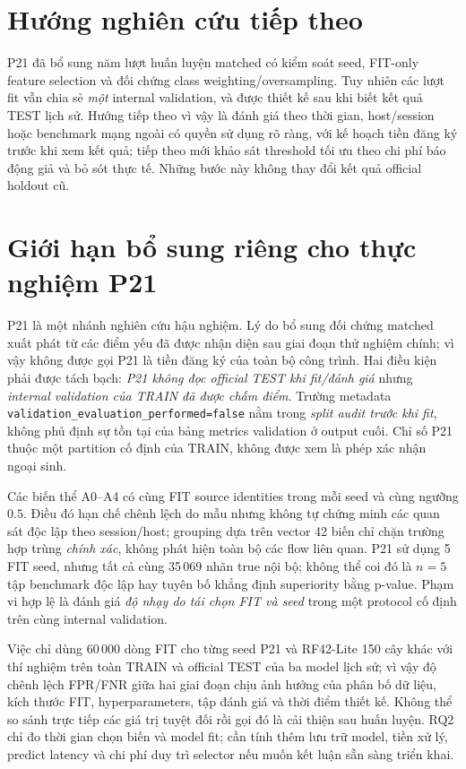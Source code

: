 \section{Hướng nghiên cứu tiếp theo}

P21 đã bổ sung năm lượt huấn luyện matched có kiểm soát seed, FIT-only feature selection và đối chứng class weighting/oversampling. Tuy nhiên các lượt fit vẫn chia sẻ \emph{một} internal validation, và được thiết kế sau khi biết kết quả TEST lịch sử. Hướng tiếp theo vì vậy là đánh giá theo thời gian, host/session hoặc benchmark mạng ngoài có quyền sử dụng rõ ràng, với kế hoạch tiền đăng ký trước khi xem kết quả; tiếp theo mới khảo sát threshold tối ưu theo chi phí báo động giả và bỏ sót thực tế. Những bước này không thay đổi kết quả official holdout cũ.


\section{Giới hạn bổ sung riêng cho thực nghiệm P21}
\label{sec:p21-validity}
P21 là một nhánh nghiên cứu hậu nghiệm. Lý do bổ sung đối chứng matched xuất phát từ các điểm yếu đã được nhận diện sau giai đoạn thử nghiệm chính; vì vậy không được gọi P21 là tiền đăng ký của toàn bộ công trình. Hai điều kiện phải được tách bạch: \emph{P21 không đọc official TEST khi fit/đánh giá} nhưng \emph{internal validation của TRAIN đã được chấm điểm}. Trường metadata \texttt{validation\_evaluation\_performed=false} nằm trong \emph{split audit trước khi fit}, không phủ định sự tồn tại của bảng metrics validation ở output cuối. Chỉ số P21 thuộc một partition cố định của TRAIN, không được xem là phép xác nhận ngoại sinh.

Các biến thể A0--A4 có cùng FIT source identities trong mỗi seed và cùng ngưỡng $0.5$. Điều đó hạn chế chênh lệch do mẫu nhưng không tự chứng minh các quan sát độc lập theo session/host; grouping dựa trên vector 42 biến chỉ chặn trường hợp trùng \emph{chính xác}, không phát hiện toàn bộ các flow liên quan. P21 sử dụng 5 FIT seed, nhưng tất cả cùng 35\,069 nhãn true nội bộ; không thể coi đó là $n=5$ tập benchmark độc lập hay tuyên bố khẳng định superiority bằng p-value. Phạm vi hợp lệ là đánh giá \emph{độ nhạy do tái chọn FIT và seed} trong một protocol cố định trên cùng internal validation.

Việc chỉ dùng 60\,000 dòng FIT cho từng seed P21 và RF42-Lite 150 cây khác với thí nghiệm trên toàn TRAIN và official TEST của ba model lịch sử; vì vậy độ chênh lệch FPR/FNR giữa hai giai đoạn chịu ảnh hưởng của phân bố dữ liệu, kích thước FIT, hyperparameters, tập đánh giá và thời điểm thiết kế. Không thể so sánh trực tiếp các giá trị tuyệt đối rồi gọi đó là cải thiện sau huấn luyện. RQ2 chỉ đo thời gian chọn biến và model fit; cần tính thêm lưu trữ model, tiền xử lý, predict latency và chi phí duy trì selector nếu muốn kết luận sẵn sàng triển khai.
